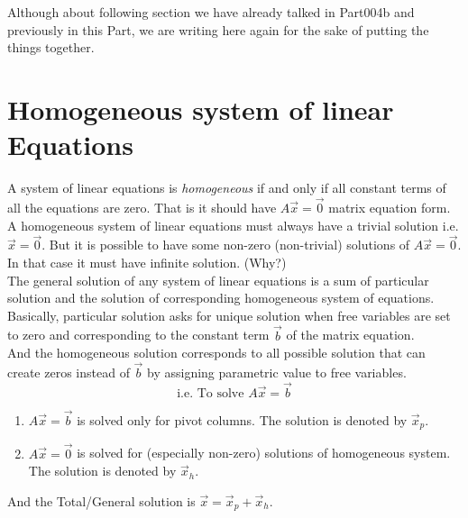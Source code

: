 \documentclass{article}
\begin{document}
Although about following section we have already talked in Part004b and previously in this Part, we are writing here again for the sake of putting the things together.

\section{Homogeneous system of linear Equations}
A system of linear equations is \textit{homogeneous} if and only if all constant terms of all the equations are zero. That is it should have $A\vec{x} = \vec{0}$ matrix equation form. A homogeneous system of linear equations must always have a trivial solution i.e. $\vec{x} = \vec{0}$. But it is possible to have some non-zero (non-trivial) solutions of $A\vec{x} = \vec{0}$. In that case it must have infinite solution. (Why?)\\

The general solution of any system of linear equations is a sum of particular solution and the solution of corresponding homogeneous system of equations. Basically, particular solution asks for unique solution when free variables are set to zero and corresponding to the constant term $\vec{b}$ of the matrix equation.\\

And the homogeneous solution corresponds to all possible solution that can create zeros instead of $\vec{b}$ by assigning parametric value to free variables. \\

 \[ \text{i.e. To solve }A\vec{x} = \vec{b}\]
\begin{enumerate} [I]
    \item $A\vec{x} = \vec{b}$ is solved only for pivot columns. The solution is denoted by $\vec{x}_p$.
    \item $A\vec{x} = \vec{0}$ is solved for (especially non-zero) solutions of homogeneous system. The solution is denoted by $\vec{x}_h$.
\end{enumerate}
And the Total/General solution is $\vec{x} = \vec{x}_p + \vec{x}_h$.
\end{document}
